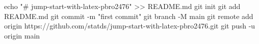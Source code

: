 echo "# jump-start-with-latex-pbro2476" >> README.md
git init
git add README.md
git commit -m "first commit"
git branch -M main
git remote add origin https://github.com/statds/jump-start-with-latex-pbro2476.git
git push -u origin main
